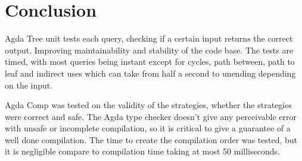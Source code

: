 \section{Conclusion}

Agda Tree unit tests each query, checking if a certain input returns the
correct output. Improving maintainability and stability of the code base. The
tests are timed, with most queries being instant except for cycles,
path between, path to leaf and indirect uses which can take from half a second
to unending depending on the input.  

Agda Comp was tested on the validity of the strategies, whether the strategies
were correct and safe. The Agda type checker doesn't give any perceivable error
with unsafe or incomplete compilation, so it is critical to give a guarantee of
a well done compilation. The time to create the compilation order was tested, but it is negligible compare to compilation time taking at most 50
milliseconds.

%

